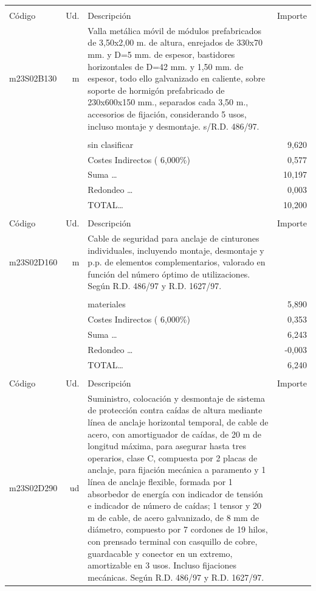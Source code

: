 \documentclass{book}%
\begin{document}
\begin{supertabular}{l r p{60mm} r}
&&&\\%
Código&Ud.&Descripción&Importe\\%
\hline%
m23S02B130&m&Valla metálica móvil de módulos prefabricados de 3,50x2,00 m. de altura, enrejados de 330x70 mm. y D=5 mm. de espesor, bastidores horizontales de D=42 mm. y 1,50 mm. de espesor, todo ello galvanizado en caliente, sobre soporte de hormigón prefabricado de 230x600x150 mm., separados cada 3,50 m., accesorios de fijación, considerando 5 usos, incluso montaje y desmontaje. s/R.D. 486/97.&\\%
&&&\\%
&&sin clasificar&     9,620\\%
&&Costes Indirectos (     6,000\%)&     0,577\\%
&&Suma \ldots&    10,197\\%
&&Redondeo \ldots&     0,003\\%
%
&&TOTAL\ldots&    10,200\\%
&&&\\%
Código&Ud.&Descripción&Importe\\%
\hline%
m23S02D160&m&Cable de seguridad para anclaje de cinturones individuales, incluyendo montaje, desmontaje y p.p. de elementos complementarios, valorado en función del número óptimo de utilizaciones. Según R.D. 486/97 y R.D. 1627/97.&\\%
&&&\\%
&&materiales&     5,890\\%
&&Costes Indirectos (     6,000\%)&     0,353\\%
&&Suma \ldots&     6,243\\%
&&Redondeo \ldots&    {-}0,003\\%
%
&&TOTAL\ldots&     6,240\\%
&&&\\%
Código&Ud.&Descripción&Importe\\%
\hline%
m23S02D290&ud&Suministro, colocación y desmontaje de sistema de protección contra caídas de altura mediante línea de anclaje horizontal temporal, de cable de acero, con amortiguador de caídas, de 20 m de longitud máxima, para asegurar hasta tres operarios, clase C, compuesta por 2 placas de anclaje, para fijación mecánica a paramento y 1 línea de anclaje flexible, formada por 1 absorbedor de energía con indicador de tensión e indicador de número de caídas; 1 tensor y 20 m de cable, de acero galvanizado, de 8 mm de diámetro, compuesto por 7 cordones de 19 hilos, con prensado terminal con casquillo de cobre, guardacable y conector en un extremo, amortizable en 3 usos. Incluso fijaciones mecánicas. Según R.D. 486/97 y R.D. 1627/97.&\\%

\end{supertabular}
\end{document}
